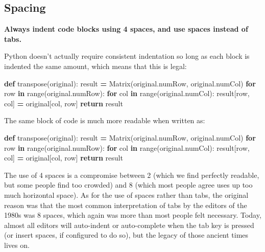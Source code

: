 \documentclass[
]{krantz}
\makeatletter
\newenvironment{Shaded}{\begin{snugshade}}{\end{snugshade}}
\newcommand{\BuiltInTok}[1]{#1}
\newcommand{\ControlFlowTok}[1]{\textcolor[rgb]{0.13,0.29,0.53}{\textbf{#1}}}
\newcommand{\KeywordTok}[1]{\textcolor[rgb]{0.13,0.29,0.53}{\textbf{#1}}}
\newcommand{\NormalTok}[1]{#1}
\newcommand{\OperatorTok}[1]{\textcolor[rgb]{0.81,0.36,0.00}{\textbf{#1}}}
\newenvironment{kframe}{%
\medskip{}
\setlength{\fboxsep}{.8em}
 \def\at@end@of@kframe{}%
 \ifinner\ifhmode%
  \def\at@end@of@kframe{\end{minipage}}%
  \begin{minipage}{\columnwidth}%
 \fi\fi%
 \def\FrameCommand##1{\hskip\@totalleftmargin \hskip-\fboxsep
 \colorbox{shadecolor}{##1}\hskip-\fboxsep
     \hskip-\linewidth \hskip-\@totalleftmargin \hskip\columnwidth}%
 \MakeFramed {\advance\hsize-\width
   \@totalleftmargin\z@ \linewidth\hsize
   \@setminipage}}%
 {\par\unskip\endMakeFramed%
 \at@end@of@kframe}
\renewenvironment{Shaded}{\begin{kframe}}{\end{kframe}}
\makeatother
\begin{document}
\hypertarget{spacing}{%
\subsection{Spacing}\label{spacing}}

\textbf{Always indent code blocks using 4 spaces, and use spaces instead of tabs.}

Python doesn't actually require consistent indentation
so long as each block is indented the same amount,
which means that this is legal:

\begin{Shaded}
\begin{Highlighting}[]
\KeywordTok{def}\NormalTok{ transpose(original):}
\NormalTok{  result }\OperatorTok{=}\NormalTok{ Matrix(original.numRow, original.numCol)}
  \ControlFlowTok{for}\NormalTok{ row }\KeywordTok{in} \BuiltInTok{range}\NormalTok{(original.numRow):}
              \ControlFlowTok{for}\NormalTok{ col }\KeywordTok{in} \BuiltInTok{range}\NormalTok{(original.numCol):}
\NormalTok{               result[row, col] }\OperatorTok{=}\NormalTok{ original[col, row]}
  \ControlFlowTok{return}\NormalTok{ result}
\end{Highlighting}
\end{Shaded}

The same block of code is much more readable when written as:

\begin{Shaded}
\begin{Highlighting}[]
\KeywordTok{def}\NormalTok{ transpose(original):}
\NormalTok{    result }\OperatorTok{=}\NormalTok{ Matrix(original.numRow, original.numCol)}
    \ControlFlowTok{for}\NormalTok{ row }\KeywordTok{in} \BuiltInTok{range}\NormalTok{(original.numRow):}
        \ControlFlowTok{for}\NormalTok{ col }\KeywordTok{in} \BuiltInTok{range}\NormalTok{(original.numCol):}
\NormalTok{            result[row, col] }\OperatorTok{=}\NormalTok{ original[col, row]}
    \ControlFlowTok{return}\NormalTok{ result}
\end{Highlighting}
\end{Shaded}

The use of 4 spaces is a compromise between 2
(which we find perfectly readable, but some people find too crowded)
and 8
(which most people agree uses up too much horizontal space).
As for the use of spaces rather than tabs,
the original reason was that the most common interpretation of tabs
by the editors of the 1980s was 8 spaces,
which again was more than most people felt necessary.
Today,
almost all editors will auto-indent or auto-complete when the tab key is pressed
(or insert spaces, if configured to do so),
but the legacy of those ancient times lives on.
\end{document}

